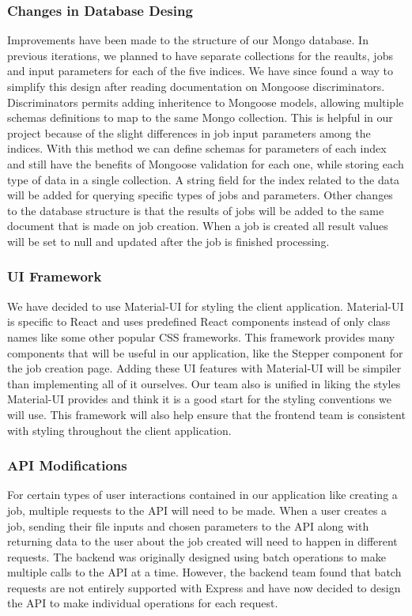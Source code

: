\subsubsection{Changes in Database Desing}
Improvements have been made to the structure of our Mongo database. In previous iterations, we planned to have separate collections for the reaults, jobs and input parameters for each of the five indices. We have since found a way to simplify this design after reading documentation on Mongoose discriminators. Discriminators permits adding inheritence to Mongoose models, allowing multiple schemas definitions to map to the same Mongo collection. This is helpful in our project because of the slight differences in job input parameters among the indices. With this method we can define schemas for parameters of each index and still have the benefits of Mongoose validation for each one, while storing each type of data in a single collection. A string field for the index related to the data will be added for querying specific types of jobs and parameters.
Other changes to the database structure is that the results of jobs will be added to the same document that is made on job creation. When a job is created all result values will be set to null and updated after the job is finished processing. 

\subsubsection{UI Framework}
We have decided to use Material-UI for styling the client application. Material-UI is specific to React and  uses predefined React components instead of only class names like some other popular CSS frameworks. This framework provides many components that will be useful in our application, like the Stepper component for the job creation page. Adding these UI features with Material-UI will be simpiler than implementing all of it ourselves. Our team also is unified in liking the styles Material-UI provides and think it is a good start for the styling conventions we will use. This framework will also help ensure that the frontend team is consistent with styling throughout the client application.

\subsubsection{API Modifications}
For certain types of user interactions contained in our application like creating a job, multiple requests to the API will need to be made. When a user creates a job, sending their file inputs and chosen parameters to the API along with returning data to the user about the job created will need to happen in different requests. The backend was originally designed using batch operations to make multiple calls to the API at a time. However, the backend team found that batch requests are not entirely supported with Express and have now decided to design the API to make individual operations for each request.
